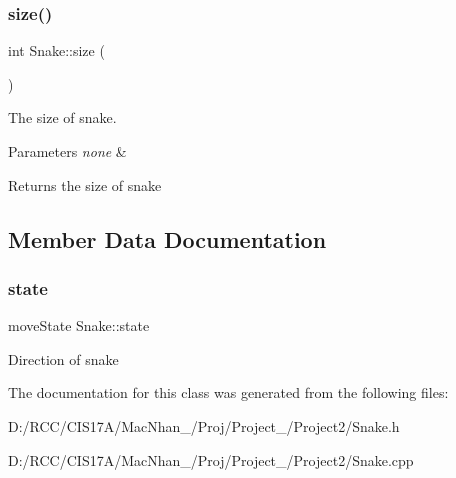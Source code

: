 \subsubsection{\texorpdfstring{size()}{size()}}
{\footnotesize\ttfamily int Snake\+::size (\begin{DoxyParamCaption}{ }\end{DoxyParamCaption})}



The size of snake. 


\begin{DoxyParams}{Parameters}
{\em none} & \\
\hline
\end{DoxyParams}
\begin{DoxyReturn}{Returns}
the size of snake 
\end{DoxyReturn}


\subsection{Member Data Documentation}
\mbox{\label{class_snake_a55f2ac9d5eb97c9f86b001d47ce0e8dc}} 
\subsubsection{\texorpdfstring{state}{state}}
{\footnotesize\ttfamily move\+State Snake\+::state}

Direction of snake 

The documentation for this class was generated from the following files\+:\begin{DoxyCompactItemize}
\item 
D\+:/\+R\+C\+C/\+C\+I\+S17\+A/\+Mac\+Nhan\+\_/\+Proj/\+Project\+\_/\+Project2/Snake.\+h\item 
D\+:/\+R\+C\+C/\+C\+I\+S17\+A/\+Mac\+Nhan\+\_/\+Proj/\+Project\+\_/\+Project2/Snake.\+cpp\end{DoxyCompactItemize}
